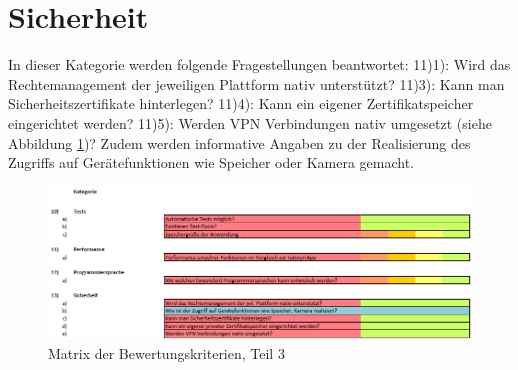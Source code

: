 \section{Sicherheit}

In dieser Kategorie werden folgende Fragestellungen beantwortet: 11)1): Wird das Rechtemanagement der jeweiligen Plattform nativ unterstützt? 11)3): Kann man Sicherheitszertifikate hinterlegen? 11)4): Kann ein eigener Zertifikatspeicher eingerichtet werden? 11)5): Werden VPN Verbindungen nativ umgesetzt (siehe Abbildung \ref{fig:Bewertungskriterien_3})? Zudem werden informative Angaben zu der Realisierung des Zugriffs auf Gerätefunktionen wie Speicher oder Kamera gemacht.  

\begin{figure}[h]
	\centering
	\includegraphics[width=1\textwidth]{Bilder/Bewertungsmatrix_3.PNG}
	\caption{Matrix der Bewertungskriterien, Teil 3}
	\label{fig:Bewertungskriterien_3}
\end{figure}